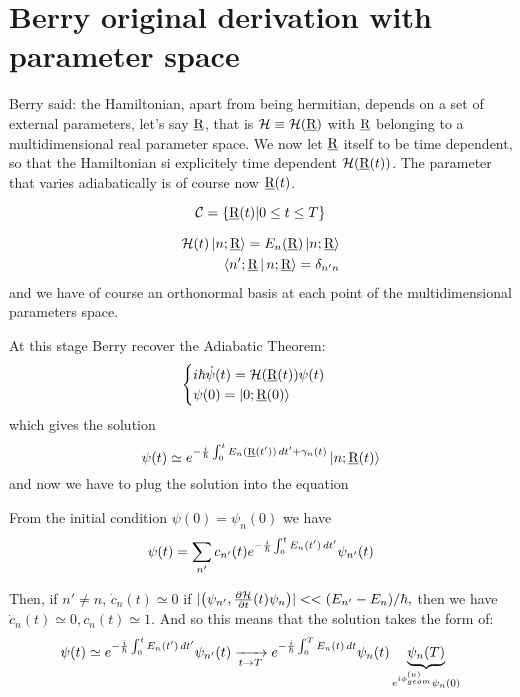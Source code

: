 \section{Berry original derivation with parameter space}
Berry said: the Hamiltonian, apart from being hermitian, depends on a set of external parameters, let's say $ \underline{\textrm{R}} $, that is $ \mathcal{H}\equiv\mathcal{H}(\underline{\textrm{R}}) $ with $ \underline{\textrm{R}} $ belonging to a multidimensional real parameter space. We now let $ \underline{\textrm{R}} $ itself to be time dependent, so that the Hamiltonian si explicitely time dependent $ \mathcal{H}(\underline{\textrm{R}}(t)) $. The parameter that varies adiabatically is of course now $ \underline{\textrm{R}}(t) $.


\begin{equation}
\mathcal{C}=\left\{\underline{\textrm{R}}(t)|0\leq t\leq T \right\}
\label{eq:Curve_C}
\end{equation}

\begin{align}
\mathcal{H}(t)\Ket{n;\underline{\textrm{R}}}=E_n(\underline{\textrm{R}})\Ket{n;\underline{\textrm{R}}}\\
\Braket{n';\underline{\textrm{R}}|n;\underline{\textrm{R}}}=\delta_{n'n}
\end{align}
and we have of course an orthonormal basis at each point of the multidimensional parameters space.

At this stage Berry recover the Adiabatic Theorem:
\begin{equation}
\begin{cases}
i\hbar\dot{\psi}(t)=\mathcal{H}(\underline{\textrm{R}}(t))\psi(t)\\
\psi(0)=\Ket{0;\underline{\textrm{R}}(0)}
\end{cases}
\end{equation}
which gives the solution
\begin{equation}
\psi(t)\simeq e^{-\frac{i}{\hbar}\int_{0}^{t}E_n(\underline{\textrm{R}}(t'))\mathop{}\!d t'+\gamma_n(t)}\Ket{n;\underline{\textrm{R}}(t)}
\end{equation}
and now we have to plug the solution into the \Sch equation

From the initial condition $ \psi(0)=\psi_n(0) $ we have
\begin{equation}
\psi(t)=\sum_{n'}c_{n'}(t)e^{-\frac{i}{\hbar}\int_{0}^{t}E_n(t')\mathop{}\!d t'}\psi_{n'}(t)
\end{equation}

Then, if $ n'\neq n $, $ \dot{c}_n(t)\simeq 0 $ if $ \lvert\left(\psi_{n'},\frac{\partial \mathcal{H}}{\partial t}(t)\psi_n \right) \rvert<<(E_{n'}-E_{n})/\hbar, $
then we have $ \dot{c}_n(t)\simeq0, c_n(t)\simeq 1. $ And so this means that the \Sch solution takes the form of:
\begin{equation}
\psi(t)\simeq e^{-\frac{i}{\hbar}\int_{0}^{t}E_n(t')\mathop{}\!d t'}\psi_{n'}(t) \xrightarrow[t\to T]{} e^{-\frac{i}{\hbar}\int_{0}^{T}E_n(t)\mathop{}\!d t}\psi_{n}(t)\underbrace{\psi_n(T)}_{e^{i\phi_{geom}^{(n)}}\psi_n(0)}
\end{equation}

